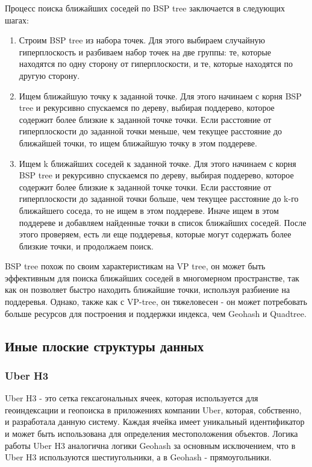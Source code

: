 Процесс поиска ближайших соседей по BSP tree заключается в следующих шагах:
\begin{enumerate}
    \item Строим BSP tree из набора точек. Для этого выбираем случайную гиперплоскость и разбиваем набор точек на две группы: те, которые находятся по одну сторону от гиперплоскости, и те, которые находятся по другую сторону.
    \item Ищем ближайшую точку к заданной точке. Для этого начинаем с корня BSP tree и рекурсивно спускаемся по дереву, выбирая поддерево, которое содержит более близкие к заданной точке точки. Если расстояние от гиперплоскости до заданной точки меньше, чем текущее расстояние до ближайшей точки, то ищем ближайшую точку в этом поддереве.
    \item Ищем k ближайших соседей к заданной точке. Для этого начинаем с корня BSP tree и рекурсивно спускаемся по дереву, выбирая поддерево, которое содержит более близкие к заданной точке точки. Если расстояние от гиперплоскости до заданной точки больше, чем текущее расстояние до k-го ближайшего соседа, то не ищем в этом поддереве. Иначе ищем в этом поддереве и добавляем найденные точки в список ближайших соседей. После этого проверяем, есть ли еще поддеревья, которые могут содержать более близкие точки, и продолжаем поиск.
\end{enumerate}

BSP tree похож по своим характеристикам на VP tree, он может быть эффективным для поиска ближайших соседей в многомерном пространстве, так как он позволяет быстро находить ближайшие точки, используя разбиение на поддеревья. Однако, также как с VP-tree, он тяжеловесен - он может потребовать больше ресурсов для построения и поддержки индекса, чем Geohash и Quadtree.

\subsection{Иные плоские структуры данных}
\subsubsection{Uber H3}
Uber H3 - это сетка гексагональных ячеек, которая используется для геоиндексации и геопоиска в приложениях компании Uber, которая, собственно, и разработала данную систему. Каждая ячейка имеет уникальный идентификатор и может быть использована для определения местоположения объектов. Логика работы Uber H3 аналогична логики Geohash за основным исключением, что в Uber H3 используются шестиугольники, а в Geohash - прямоугольники.

